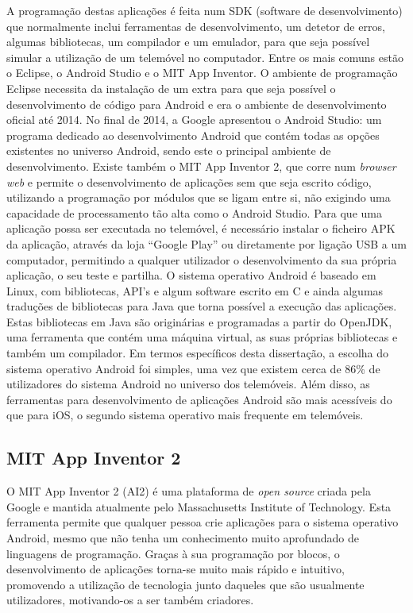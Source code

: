 A programação destas aplicações é feita num SDK (software de desenvolvimento) que normalmente inclui ferramentas de desenvolvimento, um detetor de erros, algumas bibliotecas, um compilador e um emulador, para que seja possível simular a utilização de um telemóvel no computador.
Entre os mais comuns estão o Eclipse, o Android Studio e o MIT App Inventor.
O ambiente de programação Eclipse necessita da instalação de um extra para que seja possível o desenvolvimento de código para Android e era o ambiente de desenvolvimento oficial até 2014.
No final de 2014, a Google apresentou o Android Studio: um programa dedicado ao desenvolvimento Android que contém todas as opções existentes no universo Android, sendo este o principal ambiente de desenvolvimento.
Existe também o MIT App Inventor 2, que corre num \emph{browser web} e permite o desenvolvimento de aplicações sem que seja escrito código, utilizando a programação por módulos que se ligam entre si, não exigindo uma capacidade de processamento tão alta como o Android Studio.
Para que uma aplicação possa ser executada no telemóvel, é necessário instalar o ficheiro APK da aplicação, através da loja ``Google Play'' ou diretamente por ligação USB a um computador, permitindo a qualquer utilizador o desenvolvimento da sua própria aplicação, o seu teste e partilha.
O sistema operativo Android é baseado em Linux, com bibliotecas, API's e algum software escrito em C e ainda algumas traduções de bibliotecas para Java que torna possível a execução das aplicações.
Estas bibliotecas em Java são originárias e programadas a partir do OpenJDK, uma ferramenta que contém uma máquina virtual, as suas próprias bibliotecas e também um compilador.
Em termos específicos desta dissertação, a escolha do sistema operativo Android foi simples, uma vez que existem cerca de 86\% de utilizadores do sistema Android no universo dos telemóveis.
Além disso, as ferramentas para desenvolvimento de aplicações Android são mais acessíveis do que para iOS, o segundo sistema operativo mais frequente em telemóveis.

\subsection{MIT App Inventor 2}
\label{subsec:MIT_AI2}

O MIT App Inventor 2 (AI2) é uma plataforma de \emph{open source} criada pela Google e mantida atualmente pelo Massachusetts Institute of Technology.
Esta ferramenta permite que qualquer pessoa crie aplicações para o sistema operativo Android, mesmo que não tenha um conhecimento muito aprofundado de linguagens de programação. 
Graças à sua programação por blocos, o desenvolvimento de aplicações torna-se muito mais rápido e intuitivo, promovendo a utilização de tecnologia junto daqueles que são usualmente utilizadores, motivando-os a ser também criadores.

